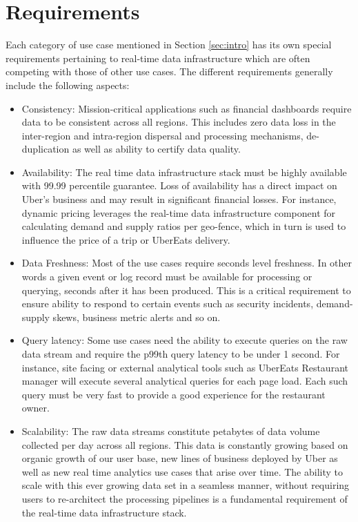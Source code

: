 \documentclass[sigconf]{acmart}
\begin{document}
\section{Requirements} \label{sec:requirements}

Each category of use case mentioned in Section \ref{sec:intro} has its own special requirements pertaining to real-time data infrastructure which are often competing with those of other use cases. The different requirements generally include the following aspects:

\begin{itemize}
\item Consistency: Mission-critical applications such as financial dashboards require data to be consistent across all regions. This includes zero data loss in the inter-region and intra-region dispersal and processing mechanisms, de-duplication as well as ability to certify data quality. 

\item Availability: The real time data infrastructure stack must be highly available with 99.99 percentile guarantee. Loss of availability has a direct impact on Uber’s business and may result in significant financial losses. For instance, dynamic pricing leverages the real-time data infrastructure component for calculating demand and supply ratios per geo-fence, which in turn is used to influence the price of a trip or UberEats delivery.

\item Data Freshness: Most of the use cases require seconds level freshness. In other words a given event or log record must be available for processing or querying, seconds after it has been produced. This is a critical requirement to ensure ability to respond to certain events such as security incidents, demand-supply skews, business metric alerts and so on.

\item Query latency: Some use cases need the ability to execute queries on the raw data stream and require the p99th query latency to be under 1 second. For instance, site facing or external analytical tools such as UberEats Restaurant manager\cite{rm} will execute several analytical queries for each page load. Each such query must be very fast to provide a good experience for the restaurant owner.

\item  Scalability: The raw data streams constitute petabytes of data volume collected per day across all regions. This data is constantly growing based on organic growth of our user base, new lines of business deployed by Uber as well as new real time analytics use cases that arise over time. The ability to scale with this ever growing data set in a seamless manner, without requiring users to re-architect the processing pipelines is a fundamental requirement of the real-time data infrastructure stack.


\end{itemize}
\end{document}
